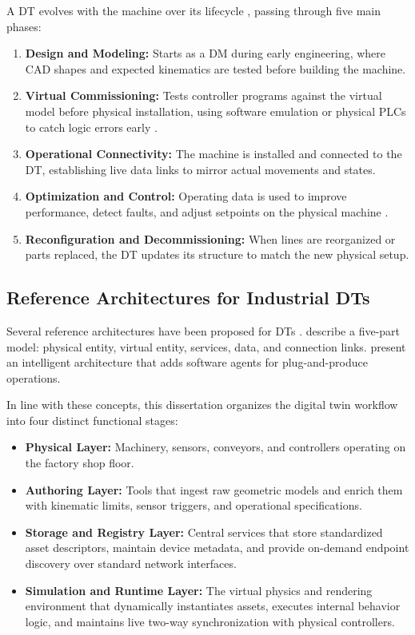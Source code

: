 A \gls{DT} evolves with the machine over its lifecycle \cite{Jones2020,Khan2025}, passing through five main phases:
\begin{enumerate}
    \item \textbf{Design and Modeling:} Starts as a \gls{DM} during early engineering, where \gls{CAD} shapes and expected kinematics are tested before building the machine.
    \item \textbf{Virtual Commissioning:} Tests controller programs against the virtual model before physical installation, using software emulation or physical \glspl{PLC} to catch logic errors early \cite{Striffler2023}.
    \item \textbf{Operational Connectivity:} The machine is installed and connected to the \gls{DT}, establishing live data links to mirror actual movements and states.
    \item \textbf{Optimization and Control:} Operating data is used to improve performance, detect faults, and adjust setpoints on the physical machine \cite{Tao2019}.
    \item \textbf{Reconfiguration and Decommissioning:} When lines are reorganized or parts replaced, the \gls{DT} updates its structure to match the new physical setup.
\end{enumerate}

\subsection{Reference Architectures for Industrial \texorpdfstring{\glspl{DT}}{Digital Twins}}

Several reference architectures have been proposed for \glspl{DT} \cite{Semeraro2021}. \textcite{Tao2019} describe a five-part model: physical entity, virtual entity, services, data, and connection links. \textcite{AshtariTalkhestani2019} present an intelligent architecture that adds software agents for plug-and-produce operations.

In line with these concepts, this dissertation organizes the digital twin workflow into four distinct functional stages:
\begin{itemize}
    \item \textbf{Physical Layer:} Machinery, sensors, conveyors, and controllers operating on the factory shop floor.
    \item \textbf{Authoring Layer:} Tools that ingest raw geometric models and enrich them with kinematic limits, sensor triggers, and operational specifications.
    \item \textbf{Storage and Registry Layer:} Central services that store standardized asset descriptors, maintain device metadata, and provide on-demand endpoint discovery over standard network interfaces.
    \item \textbf{Simulation and Runtime Layer:} The virtual physics and rendering environment that dynamically instantiates assets, executes internal behavior logic, and maintains live two-way synchronization with physical controllers.
\end{itemize}

